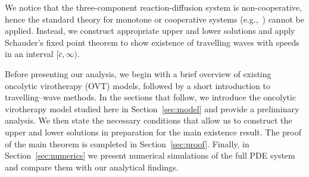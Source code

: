 \documentclass[11pt]{article}
\theoremstyle{definition}
\begin{document}
We notice that the three-component reaction-diffusion system is non-cooperative, hence the standard theory for monotone or cooperative systems (e.g.,~\cite{FangJian2009MWfP, LiangXing2007Asos, MaShiwang2001TWfD, WeinbergerHansF.2002Aold, WuJianhong2001TWFo, WangHaiyan2011SSaT_epidemy_travekingwave}) cannot be applied. Instead,  we construct appropriate upper and lower solutions and apply Schauder's fixed point theorem to show existence of travelling waves with speeds in an interval $[\bar c, \infty)$. 

Before presenting our analysis, we begin with a brief overview of existing oncolytic virotherapy (OVT) models, followed by a short introduction to travelling–wave methods. 
In the sections that follow, we introduce the oncolytic virotherapy model studied here in Section~\ref{sec:model} and provide a preliminary analysis. We then state the necessary conditions that allow us to construct the upper and lower solutions in preparation for the main existence result. The proof of the main theorem is completed in Section~\ref{sec:proof}. Finally, in Section~\ref{sec:numerics} we present numerical simulations of the full PDE system and compare them with our analytical findings.
\end{document}
